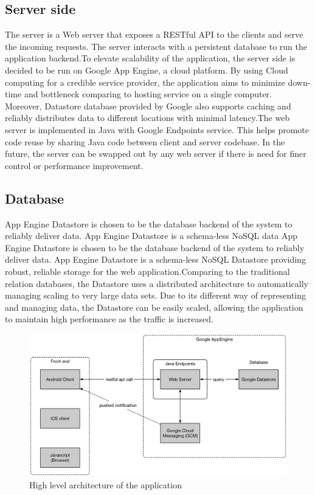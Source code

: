 \subsection{Server side}

The server is a Web server that exposes a RESTful API to the clients and serve the incoming requests. The server interacts with a persistent database to run the application backend.To elevate scalability of the application, the server side is decided to be run on Google App Engine, a cloud platform. By using Cloud computing for a credible service provider, the application aims to minimize down-time and bottleneck comparing to hosting service on a single computer. Moreover, Datastore database provided by Google also supports caching and reliably distributes data to different locations with minimal latency.The web server is implemented in Java with Google Endpoints service. This helps promote code reuse by sharing Java code between client and server codebase. In the future, the server can be swapped out by any web server if there is need for finer control or performance improvement.

\subsection{Database}

App Engine Datastore is chosen to be the database backend of the system to reliably deliver data. App Engine Datastore is a schema-less NoSQL data
App Engine Datastore is chosen to be the database backend of the system to reliably deliver data. App Engine Datastore is a schema-less NoSQL Datastore providing robust, reliable storage for the web application.Comparing to the traditional relation databases, the Datastore uses a distributed architecture to automatically managing scaling to very large data sets. Due to its different way of representing and managing data, the Datastore can be easily scaled, allowing the application to maintain high performance as the traffic is increased.

\begin{figure}
\includegraphics[width=\textwidth]{Architecture}
\caption{High level architecture of the application}
\end{figure}

